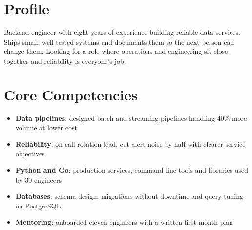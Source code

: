 \documentclass[11pt,a4paper,sans]{moderncv}
\begin{document}
\makecvtitle

\section{Profile}
Backend engineer with eight years of experience building reliable data services. Ships small, well-tested systems and
documents them so the next person can change them. Looking for a role where operations and engineering sit close
together and reliability is everyone's job.

\section{Core Competencies}
\begin{itemize}
  \item \textbf{Data pipelines}: designed batch and streaming pipelines handling 40\% more volume at lower cost
  \item \textbf{Reliability}: on-call rotation lead, cut alert noise by half with clearer service objectives
  \item \textbf{Python and Go}: production services, command line tools and libraries used by 30 engineers
  \item \textbf{Databases}: schema design, migrations without downtime and query tuning on PostgreSQL
  \item \textbf{Mentoring}: onboarded eleven engineers with a written first-month plan
\end{itemize}
\end{document}
